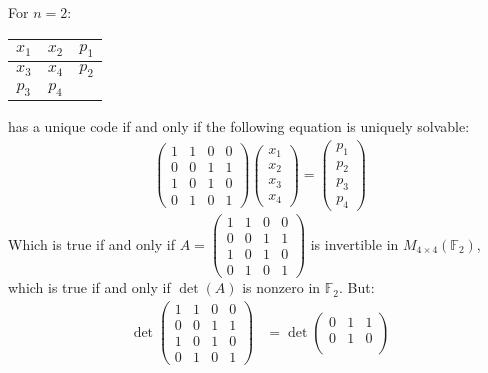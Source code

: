 \documentclass{article}
\begin{document}
\begin{enumerate}[(a)]
    For $n = 2$:
    \begin{tabular}{| c | c | c |}
      \hline
      $x_1$ & $x_2$ & $p_1$ \\
      \hline
      $x_3$ & $x_4$ & $p_2$ \\
      \hline
      $p_3$ & $p_4$ &   \\
      \hline
    \end{tabular}
    has a unique code if and only if the following equation is uniquely
    solvable:
    \begin{align*}
      \begin{pmatrix}
        1 & 1 & 0 & 0 \\
        0 & 0 & 1 & 1 \\
        1 & 0 & 1 & 0 \\
        0 & 1 & 0 & 1
      \end{pmatrix}
      \begin{pmatrix}
        x_1 \\ x_2 \\ x_3 \\ x_4
      \end{pmatrix} =
      \begin{pmatrix}
        p_1 \\ p_2 \\ p_3 \\ p_4
      \end{pmatrix}
    \end{align*}
    Which is true if and only if
    $A = \begin{pmatrix}
      1 & 1 & 0 & 0 \\
      0 & 0 & 1 & 1 \\
      1 & 0 & 1 & 0 \\
      0 & 1 & 0 & 1
    \end{pmatrix}$ is invertible in $M_{4 \times 4}(\mathbb{F}_2)$, which is
    true if and only if $\det(A)$ is nonzero in $\mathbb{F}_2$. But:
    \begin{align*}
      \det
      \begin{pmatrix}
        1 & 1 & 0 & 0 \\
        0 & 0 & 1 & 1 \\
        1 & 0 & 1 & 0 \\
        0 & 1 & 0 & 1
      \end{pmatrix}
      & =
          \det
          \begin{pmatrix}
            0 & 1 & 1 \\
            0 & 1 & 0 \\

\end{pmatrix}
\end{align*}
\end{enumerate}
\end{document}
